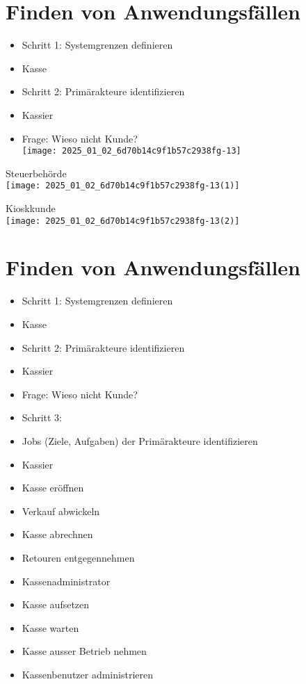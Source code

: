 \documentclass[10pt]{article}
\begin{document}
\section*{Finden von Anwendungsfällen}
\begin{itemize}
  \item Schritt 1: Systemgrenzen definieren
  \item Kasse
  \item Schritt 2: Primärakteure identifizieren
  \item Kassier
  \item Frage: Wieso nicht Kunde?\\
\texttt{[image: 2025\_01\_02\_6d70b14c9f1b57c2938fg-13]}
\end{itemize}

Steuerbehörde\\
\texttt{[image: 2025\_01\_02\_6d70b14c9f1b57c2938fg-13(1)]}

Kioskkunde\\
\texttt{[image: 2025\_01\_02\_6d70b14c9f1b57c2938fg-13(2)]}

\section*{Finden von Anwendungsfällen}
\begin{itemize}
  \item Schritt 1: Systemgrenzen definieren
  \item Kasse
  \item Schritt 2: Primärakteure identifizieren
  \item Kassier
  \item Frage: Wieso nicht Kunde?
  \item Schritt 3:
  \item Jobs (Ziele, Aufgaben) der Primärakteure identifizieren
  \item Kassier
  \item Kasse eröffnen
  \item Verkauf abwickeln
  \item Kasse abrechnen
  \item Retouren entgegennehmen
  \item Kassenadministrator
  \item Kasse aufsetzen
  \item Kasse warten
  \item Kasse ausser Betrieb nehmen
  \item Kassenbenutzer administrieren
\end{itemize}
\end{document}
